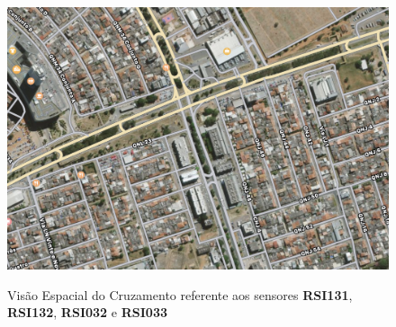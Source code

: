 \begin{figure}[t]
    \centering
    \includegraphics[scale=0.6]{monography/img/maps/cruzamento_2.png}
    \label{figure:helio_cruzamento_2}
    \caption[Visão Espacial do Cruzamento referente aos sensores \textbf{RSI131}, \textbf{RSI132}, \textbf{RSI032} e \textbf{RSI033}]{Visão Espacial do Cruzamento referente aos sensores \textbf{RSI131}, \textbf{RSI132}, \textbf{RSI032} e \textbf{RSI033}}
\end{figure}